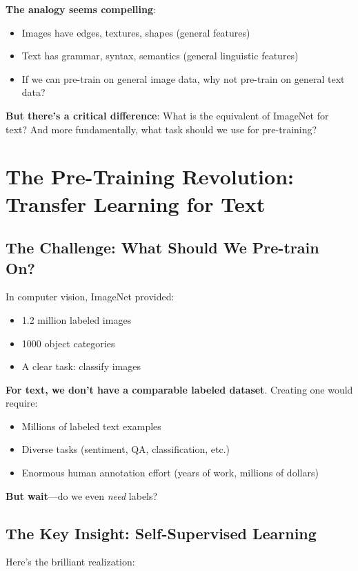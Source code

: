 \documentclass{article}
\begin{document}
\textbf{The analogy seems compelling}:
\begin{itemize}
\item Images have edges, textures, shapes (general features)
\item Text has grammar, syntax, semantics (general linguistic features)
\item If we can pre-train on general image data, why not pre-train on general text data?
\end{itemize}

\textbf{But there's a critical difference}: What is the equivalent of ImageNet for text? And more fundamentally, what task should we use for pre-training?

\section{The Pre-Training Revolution: Transfer Learning for Text}

\subsection{The Challenge: What Should We Pre-train On?}

In computer vision, ImageNet provided:
\begin{itemize}
\item 1.2 million labeled images
\item 1000 object categories
\item A clear task: classify images
\end{itemize}

\textbf{For text, we don't have a comparable labeled dataset}. Creating one would require:
\begin{itemize}
\item Millions of labeled text examples
\item Diverse tasks (sentiment, QA, classification, etc.)
\item Enormous human annotation effort (years of work, millions of dollars)
\end{itemize}

\textbf{But wait}---do we even \textit{need} labels?

\subsection{The Key Insight: Self-Supervised Learning}

Here's the brilliant realization:
\end{document}
